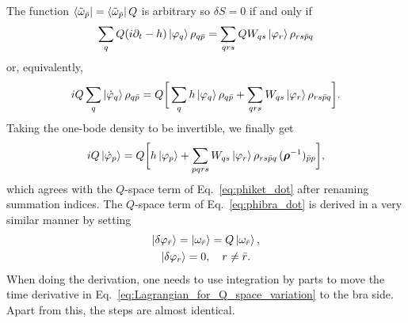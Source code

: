 \documentclass[aip,jcp,preprint,superscriptaddress,nofootinbib]{revtex4-1}
\begin{document}
The function $\bra{\tilde{\omega}_{\bar{p}}} = \bra{\tilde{\omega}_{\bar{p}}} Q$ is
arbitrary so $\delta S = 0$ if and only if
\begin{align}
    \sum_{q} Q (i \partial_t - h) \ket{\varphi_{q}} \rho_{q\bar{p}}
    = \sum_{qrs} Q W_{qs} \ket{\varphi_{r}} \rho_{rs\bar{p}q}
\end{align}
or, equivalently,
\begin{align}
    i Q \sum_{q} \ket{\dot{\varphi}_{q}} \rho_{q\bar{p}}
    = 
    Q \bigg[ \sum_{q} h \ket{\varphi_{q}} \rho_{q\bar{p}}
    + \sum_{qrs} W_{qs} \ket{\varphi_{r}} \rho_{rs\bar{p}q} \bigg].
\end{align}
Taking the one-bode density to be invertible, we finally get
\begin{align}
    i Q \ket{\dot{\varphi}_{p}}
    = 
    Q \bigg[ h \ket{\varphi_{p}}
    + \sum_{pqrs} W_{qs} \ket{\varphi_{r}} \rho_{rs\bar{p}q} \, (\bm{\rho}^{-1})_{\bar{p}p} \bigg],
\end{align}
which agrees with the $Q$-space term of Eq.~\eqref{eq:phiket_dot} after renaming summation indices.
The $Q$-space term of Eq.~\eqref{eq:phibra_dot} is derived in a very similar manner by setting
\begin{subequations}
    \begin{gather}
        \ket{\delta\varphi_{\bar{r}}} = \ket{\omega_{\bar{r}}} = Q \ket{\omega_{\bar{r}}}, \\
        \ket{\delta\varphi_{r}}  = 0, \quad r \neq \bar{r}.
    \end{gather}
\end{subequations}
When doing the derivation, one needs to use integration by parts 
to move the time derivative in Eq.~\eqref{eq:Lagrangian_for_Q_space_variation}
to the bra side. Apart from this, the steps are almost identical.
\end{document}
